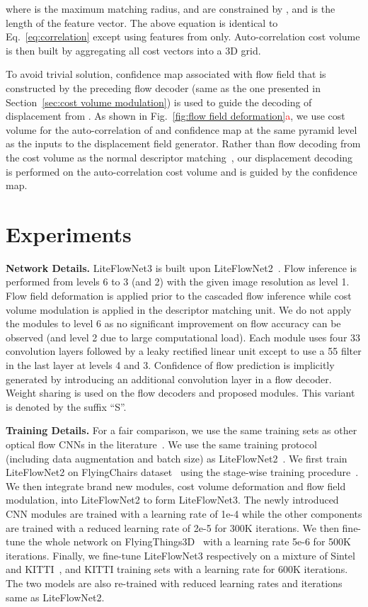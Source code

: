 \documentclass[runningheads]{llncs}
\begin{document}
where  is the maximum matching radius,  and  are constrained by , and  is the length of the feature vector. The above equation is identical to Eq.~\eqref{eq:correlation} except using features from  only. Auto-correlation cost volume  is then built by aggregating all cost vectors into a 3D grid.

To avoid trivial solution, confidence map  associated with flow field  that is constructed by the preceding flow decoder (same as the one presented in Section~\ref{sec:cost volume modulation}) is used to guide the decoding of displacement from .
As shown in Fig.~\ref{fig:flow field deformation}\textcolor{red}{a}, we use cost volume  for the auto-correlation of  and confidence map  at the same pyramid level as the inputs to the displacement field generator. Rather than flow decoding from the cost volume as the normal descriptor matching~\cite{Dosovitskiy15}, our displacement decoding is performed on the auto-correlation cost volume and is guided by the confidence map. 

\section{Experiments} \label{sec:experiments}
\noindent \textbf{Network Details.} LiteFlowNet3 is built upon LiteFlowNet2~\cite{Hui20}. Flow inference is performed from levels 6 to 3 (and 2) with the given image resolution as level 1. Flow field deformation is applied prior to the cascaded flow inference while cost volume modulation is applied in the descriptor matching unit.
We do not apply the modules to level 6 as no significant improvement on flow accuracy can be observed (and level 2 due to large computational load).
Each module uses four 33 convolution layers followed by a leaky rectified linear unit except to use a 55 filter in the last layer at levels 4 and 3.
Confidence of flow prediction is implicitly generated by introducing an additional convolution layer in a flow decoder.
Weight sharing is used on the flow decoders and proposed modules. This variant is denoted by the suffix ``S''.

\noindent \textbf{Training Details.} For a fair comparison, we use the same training sets as other optical flow CNNs in the literature~\cite{Dosovitskiy15,Hui18,Hui20,Hur19,Ilg17,Lu20,Ranjan17,Sun18,Sun19,Yang19}. We use the same training protocol (including data augmentation and batch size) as LiteFlowNet2~\cite{Hui20}. We first train LiteFlowNet2 on FlyingChairs dataset~\cite{Dosovitskiy15} using the stage-wise training procedure~\cite{Hui20}. We then integrate brand new modules, cost volume deformation and flow field modulation, into LiteFlowNet2 to form LiteFlowNet3. The newly introduced CNN modules are trained with a learning rate of 1e-4 while the other components are trained with a reduced learning rate of 2e-5 for 300K iterations. We then fine-tune the whole network on FlyingThings3D~\cite{Mayer16} with a learning rate 5e-6 for 500K iterations. Finally, we fine-tune LiteFlowNet3 respectively on a mixture of Sintel~\cite{Butler12} and KITTI~\cite{Menze15}, and KITTI training sets with a learning rate  for 600K iterations. The two models  are also re-trained with reduced learning rates and iterations same as LiteFlowNet2. 
\end{document}
